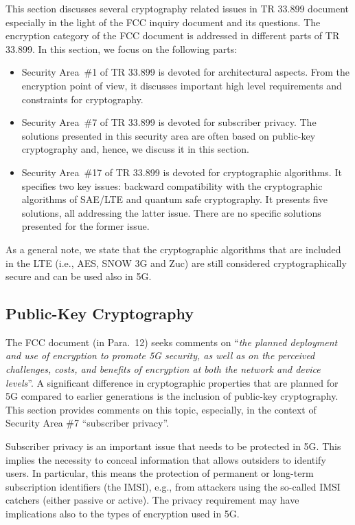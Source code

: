 \documentclass[12pt]{llncs}
\newcommand\ques[1]{``\emph{#1}''}
\begin{document}
This section discusses several cryptography related issues in TR 33.899 document especially in the light of the FCC inquiry document and its questions. The encryption category of the FCC document is addressed in different parts of TR 33.899. In this section, we focus on the following parts:
\begin{itemize}
\item Security Area~\#1 of TR 33.899 is devoted for architectural aspects. From the encryption point of view, it discusses important high level requirements and constraints for cryptography.
\item Security Area~\#7 of TR 33.899 is devoted for subscriber privacy. The solutions presented in this security area are often based on public-key cryptography and, hence, we discuss it in this section.
\item Security Area~\#17 of TR 33.899 is devoted for cryptographic algorithms. It specifies two key issues: backward compatibility with the cryptographic algorithms of SAE/LTE and quantum safe cryptography. It presents five solutions, all addressing the latter issue. There are no specific solutions presented for the former issue.  
\end{itemize}

As a general note, we state that the cryptographic algorithms that are included in the LTE (i.e., AES, SNOW 3G and Zuc) are still considered cryptographically secure and can be used also in 5G.

\subsection{Public-Key Cryptography}
\label{sec:pkc}

The FCC document (in Para.~12) seeks comments on \ques{the planned deployment and use of encryption to promote 5G security, as well as on the perceived challenges, costs, and benefits of encryption at both the network and device levels}. A significant difference in cryptographic properties that are planned for 5G compared to earlier generations is the inclusion of public-key cryptography. This section provides comments on this topic, especially, in the context of Security Area \#7 ``subscriber privacy''.

Subscriber privacy is an important issue that needs to be protected in 5G. This implies the necessity to conceal information that allows outsiders to identify users. In particular, this means the protection of permanent or long-term subscription identifiers (the IMSI), e.g., from attackers using the so-called IMSI catchers (either passive or active). The privacy requirement may have implications also to the types of encryption used in 5G.
\end{document}
